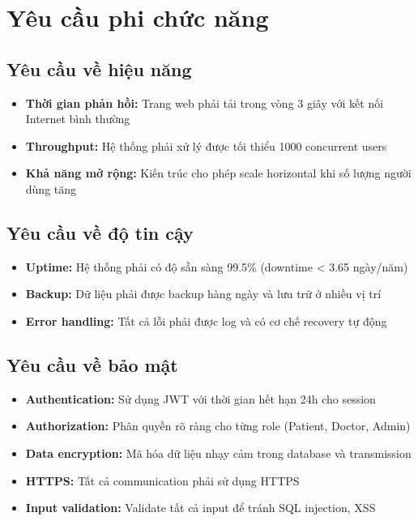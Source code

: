 \documentclass[../DoAn.tex]{subfiles}
\begin{document}
\section{Yêu cầu phi chức năng}
\label{section:2.4}

\subsection{Yêu cầu về hiệu năng}
\begin{itemize}
    \item \textbf{Thời gian phản hồi:} Trang web phải tải trong vòng 3 giây với kết nối Internet bình thường
    \item \textbf{Throughput:} Hệ thống phải xử lý được tối thiểu 1000 concurrent users
    \item \textbf{Khả năng mở rộng:} Kiến trúc cho phép scale horizontal khi số lượng người dùng tăng
\end{itemize}

\subsection{Yêu cầu về độ tin cậy}
\begin{itemize}
    \item \textbf{Uptime:} Hệ thống phải có độ sẵn sàng 99.5\% (downtime < 3.65 ngày/năm)
    \item \textbf{Backup:} Dữ liệu phải được backup hàng ngày và lưu trữ ở nhiều vị trí
    \item \textbf{Error handling:} Tất cả lỗi phải được log và có cơ chế recovery tự động
\end{itemize}

\subsection{Yêu cầu về bảo mật}
\begin{itemize}
    \item \textbf{Authentication:} Sử dụng JWT với thời gian hết hạn 24h cho session
    \item \textbf{Authorization:} Phân quyền rõ ràng cho từng role (Patient, Doctor, Admin)
    \item \textbf{Data encryption:} Mã hóa dữ liệu nhạy cảm trong database và transmission
    \item \textbf{HTTPS:} Tất cả communication phải sử dụng HTTPS
    \item \textbf{Input validation:} Validate tất cả input để tránh SQL injection, XSS
\end{itemize}
\end{document}
